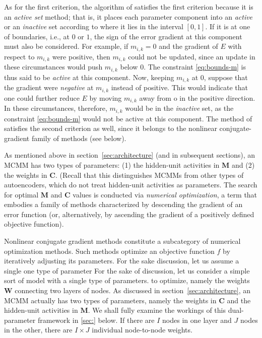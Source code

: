 As for the first criterion, the algorithm of \citet{cheng-and-li:2012} 
satisfies the first criterion because it 
is an \emph{active set} method; that is, 
it places each parameter component 
into an \emph{active} or an \emph{inactive} set according to where it lies in the interval $[0,1]$. 
If it is at one of boundaries, i.e., at $0$ or $1$, the sign of the error gradient at this component 
must also be considered. For example, if $m_{i,k} = 0$ and the gradient of $E$ 
with respect to $m_{i,k}$ were positive, then $m_{i,k}$ could not be updated, 
since an update in these circumstances would push $m_{i,k}$ below $0$.  
The constraint \eqref{eq:bounds-m} is thus said to be \emph{active} at this component. 
Now, keeping $m_{i,k}$ at $0$, suppose that  the gradient were 
\emph{negative} at $m_{i,k}$ instead of positive. 
This would indicate that one could further reduce $E$ by moving $m_{i,k}$ away 
from o in the positive direction. In these circumstances, therefore, $m_{i,k}$ 
would be in the \emph{inactive} set, as the constraint \eqref{eq:bounds-m} 
would not be active at this component.
The method of \citet{cheng-and-li:2012} satisfies the second criterion as well, 
since it belongs to the nonlinear conjugate-gradient family of methods (see below).

As mentioned above in section~\ref{sec:architecture} (and in subsequent sections), 
an MCMM has two types of parameters:
(1) the hidden-unit activities in $\textbf{M}$ and (2) the weights in $\textbf{C}$. (Recall that this 
distinguishes MCMMs from other types of autoencoders, which do not treat hidden-unit activities as parameters.  
The search for optimal $\textbf{M}$ and $\textbf{C}$ values is conducted
via \emph{numerical optimization}, a term that embodies a family of 
methods characterized by descending the gradient of an error function 
(or, alternatively, by ascending the gradient of a positively defined objective function). 

Nonlinear conjugate gradient methods constitute a subcategory 
of numerical optimization methods. Such methods optimize
an objective function $f$ by iteratively adjusting its parameters.
For the sake discussion, let us assume a single one type of parameter
For the sake of discussion, let us consider a simple sort of model with a single type of parameters.
to optimize, namely the weights $\textbf{W}$ connecting two layers of nodes. 
As discussed in section~\ref{sec:architecture},
an MCMM actually has two types of parameters, namely
the weights in $\textbf{C}$ and the hidden-unit activities in $\textbf{M}$. 
We shall fully examine the workings of this dual-parameter framework in \ref{sec:} below.
If there are $I$ nodes in one layer and $J$ nodes in the other, there are $I \times J$ 
individual node-to-node weights.

